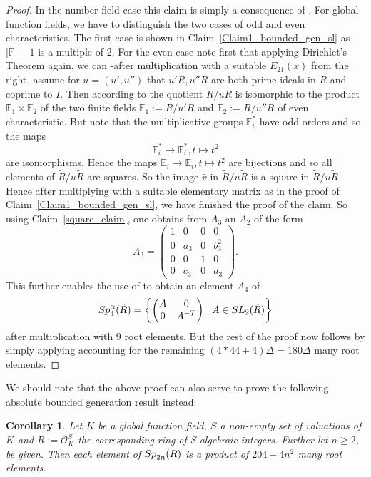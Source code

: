 \documentclass[12pt]{amsart}
\newtheorem{corollary}[theorem]{Corollary}
\theoremstyle{definition}\newtheorem{definition}[theorem]{Definition}
\theoremstyle{remark}\newtheorem{remark}[theorem]{Remark}
\theoremstyle{definition}\newtheorem{case}{Case}
\begin{document}
\begin{proof}
In the number field case this claim is simply a consequence of \cite[Lemma~4.2]{gvozdevsky2023width}. For global function fields, we have to distinguish the two cases of odd and even characteristics. The first case is shown in Claim~\ref{Claim1_bounded_gen_sl} as $|\mathbb{F}|-1$ is a multiple of $2$. For the even case note first that applying Dirichlet's Theorem again, we can -after multiplication with a suitable $E_{21}(x)$ from the right- assume for $u=(u',u'')$ that $u'R,u''R$ are both prime ideals in $R$ and coprime to $I.$ Then according to \cite[Lemma~2.1]{gvozdevsky2023width} the quotient $\tilde{R}/u\tilde{R}$ is isomorphic to the product $\mathbb{E}_1\times\mathbb{E}_2$ of the two finite fields $\mathbb{E}_1:=R/u'R$ and $\mathbb{E}_2:=R/u''R$ of even characteristic. But note that the multiplicative groups $\mathbb{E}_i^*$ have odd orders and so the maps
\[
\mathbb{E}_i^*\to\mathbb{E}_i^*,t\mapsto t^2
\]
are isomorphisms. Hence the maps $\mathbb{E}_i\to\mathbb{E}_i,t\mapsto t^2$ are bijections and so all elements of $\tilde{R}/u\tilde{R}$ are squares. So the image $\bar{v}$ in $\tilde{R}/u\tilde{R}$ is a square in $\tilde{R}/u\tilde{R}$. Hence after multiplying with a suitable elementary matrix as in the proof of Claim~\ref{Claim1_bounded_gen_sl}, we have finished the proof of the claim. So using Claim~\ref{square_claim}, one obtains from $A_3$ an $A_2$ of the form 
\[
A_3=
\begin{pmatrix}
1 & 0 & 0 & 0\\
0 & a_3 & 0 & b_3^2\\
0 & 0 & 1 & 0\\
0 & c_3 & 0 & d_3
\end{pmatrix}.
\]
This further enables the use of \cite[Lemma~2]{MR1044049} to obtain an element $A_4$ of 
\[
{\rm Sp}_4^{\alpha}(\tilde{R})=\left\{
\begin{pmatrix}
A & 0\\
0 & A^{-T}
\end{pmatrix}\mid A\in{\rm SL}_2(\tilde{R})
\right\}
\]
after multiplication with $9$ root elements. But the rest of the proof now follows by simply applying \cite[Proposition~2,Lemma~3]{MR1044049} accounting for the remaining $(4*44+4)\Delta=180\Delta$ many root elements. 
\end{proof}

We should note that the above proof can also serve to prove the following absolute bounded generation result instead:

\begin{corollary}\label{symplectic_cor_non_double}
Let $K$ be a global function field, $S$ a non-empty set of valuations of $K$ and $R:=\mathscr{O}_K^S$ the corresponding ring of S-algebraic integers. Further let $n\geq 2$, be given. Then each element of ${\rm Sp}_{2n}(R)$ is a product of $204+4n^2$ many root elements.
\end{corollary}
\end{document}
